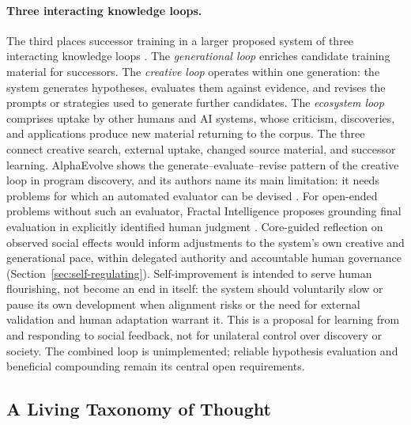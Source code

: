 \documentclass[11pt]{article}
\begin{document}
\paragraph{Three interacting knowledge loops.}
The third places successor training in a larger proposed system of three
interacting knowledge loops
\cite{westerberg2025superintelligence}. The \emph{generational loop} enriches
candidate training material for successors. The \emph{creative loop} operates
within one generation: the system generates hypotheses, evaluates them against
evidence, and revises the prompts or strategies used to generate further
candidates. The \emph{ecosystem loop} comprises uptake by other humans and AI
systems, whose criticism, discoveries, and applications produce new material
returning to the corpus. The three connect creative search, external uptake,
changed source material, and successor learning. AlphaEvolve shows the
generate--evaluate--revise pattern of the creative loop in program discovery,
and its authors name its main limitation: it needs problems for which an
automated evaluator can be devised \cite{novikov2025alphaevolve}. For
open-ended problems without such an evaluator, Fractal Intelligence proposes
grounding final evaluation in explicitly identified human judgment
\cite{westerberg2026fractal}. Core-guided reflection on
observed social effects would inform adjustments to the system's own creative
and generational pace, within delegated authority and accountable human
governance (Section~\ref{sec:self-regulating}). Self-improvement is intended to
serve human flourishing, not become an end in itself: the system should
voluntarily slow or pause its own development when alignment risks or the need
for external validation and human adaptation warrant it. This is a proposal for learning
from and responding to social feedback, not for unilateral control over
discovery or society. The combined loop is unimplemented; reliable hypothesis
evaluation and beneficial compounding remain its central open requirements.

\subsection{A Living Taxonomy of Thought}\label{sec:living-taxonomy}
\end{document}
